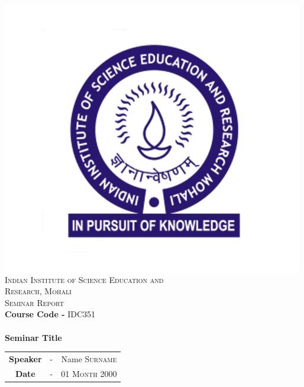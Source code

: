 \includegraphics[scale=0.5]{edit/logo.png}\\[1cm] %

\textsc{\LARGE Indian Institute of Science Education and \\[5mm]Research, Mohali}\\[1.5cm] %
\textsc{\Large Seminar Report}\\[0.5cm]
\large\textbf{Course Code -} \textsc{IDC351}\\[0.5cm] %

\HRule \\[0.6cm]
{\Large\bfseries Seminar Title}\\[0.4cm] %
\begin{tabular}{c c c}
    \large{\bfseries Speaker} & - &%
    \large{Name \textsc{Surname}}\\ %
    
    \large{\bfseries Date} & - &%
    \large{01 \textsc{Month} 2000} %
    \\[7mm]
    \end{tabular}
\HRule \\[1.5cm]
